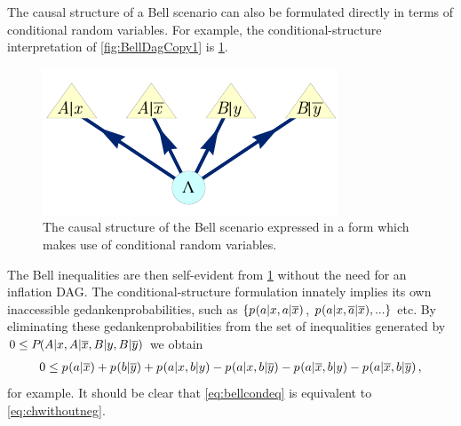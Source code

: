 The causal structure of a Bell scenario can also be formulated directly in terms of conditional random variables. For example, the conditional-structure interpretation of \cref{fig:BellDagCopy1} is \cref{fig:BellConditionalDAG}. 

\begin{figure}[t]
\centering
\begin{minipage}[t]{0.45\linewidth}
\centering
\includegraphics[scale=1]{BellDagConditionForm.pdf}
\caption{The causal structure of the Bell scenario expressed in a form which makes use of conditional random variables.}\label{fig:BellConditionalDAG}
\end{minipage}
\end{figure}

The Bell inequalities are then self-evident from \cref{fig:BellConditionalDAG} without the need for an inflation DAG. The conditional-structure formulation innately implies its own inaccessible gedankenprobabilities, such as $\{{p_{}}\lparen a|x , a|\overline{x}\rparen$, ${p_{}}\lparen a|x , \overline{a}|\overline{x}\rparen,...\}$ etc. By eliminating these gedankenprobabilities from the set of inequalities generated by $0\leq {P_{}}\lparen A|x , A|\overline{x} , B|y , B|\overline{y}\rparen$ we obtain
\begin{align}\label{eq:bellcondeq}
0
\leq
{{p_{}}\lparen a|\ensuremath{\overline{x}}\rparen + {p_{}}\lparen b|\ensuremath{\overline{y}}\rparen + {p_{}}\lparen a|x , b|y\rparen -{p_{}}\lparen a|x ,b|\ensuremath{\overline{y}}\rparen -{p_{}}\lparen a|\ensuremath{\overline{x}} , b|y\rparen -{p_{}}\lparen a|\ensuremath{\overline{x}} , b|\ensuremath{\overline{y}}\rparen}\,,
\end{align}
for example. It should be clear that \cref{eq:bellcondeq} is equivalent to \cref{eq:chwithoutneg}.


